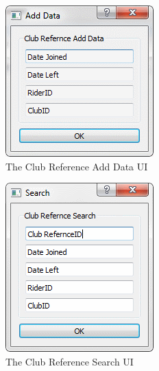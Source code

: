 \begin{figure}
\includegraphics[width=\textwidth]{./Maintenance/UI/ClubRefAD.png}
\caption{The Club Reference Add Data UI} \label{fig:ClubRefAD_UI}
\end{figure}

\begin{figure}
\includegraphics[width=\textwidth]{./Maintenance/UI/ClubRefSearch.png}
\caption{The Club Reference Search UI} \label{fig:ClubRefSearch_UI}
\end{figure}

